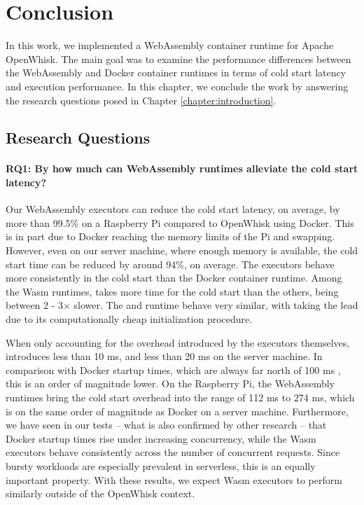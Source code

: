 \chapter{Conclusion}
\label{chapter:conclusion}

In this work, we implemented a WebAssembly container runtime for Apache OpenWhisk. The main goal was to examine the performance differences between the WebAssembly and Docker container runtimes in terms of cold start latency and execution performance. In this chapter, we conclude the work by answering the research questions posed in Chapter \ref{chapter:introduction}.

\section{Research Questions}

\subsubsection*{RQ1: By how much can WebAssembly runtimes alleviate the cold start latency?}

Our WebAssembly executors can reduce the cold start latency, on average, by more than 99.5\% on a Raspberry Pi compared to OpenWhisk using Docker. This is in part due to Docker reaching the memory limits of the Pi and swapping. However, even on our server machine, where enough memory is available, the cold start time can be reduced by around 94\%, on average. The executors behave more consistently in the cold start than the Docker container runtime. Among the Wasm runtimes,  takes more time for the cold start than the others, being between 2 - 3$\times$ slower. The  and  runtime behave very similar, with  taking the lead due to its computationally cheap initialization procedure.

When only accounting for the overhead introduced by the executors themselves,  introduces less than 10 ms, and  less than 20 ms on the server machine. In comparison with Docker startup times, which are always far north of 100 ms \cite{Wang2018, Manner2018}, this is an order of magnitude lower.
On the Raspberry Pi, the WebAssembly runtimes bring the cold start overhead into the range of 112 ms to 274 ms, which is on the same order of magnitude as Docker on a server machine.
Furthermore, we have seen in our tests -- what is also confirmed by other research \cite{Mohan2019} -- that Docker startup times rise under increasing concurrency, while the Wasm executors behave consistently across the number of concurrent requests. Since bursty workloads are especially prevalent in serverless, this is an equally important property. With these results, we expect Wasm executors to perform similarly outside of the OpenWhisk context.

